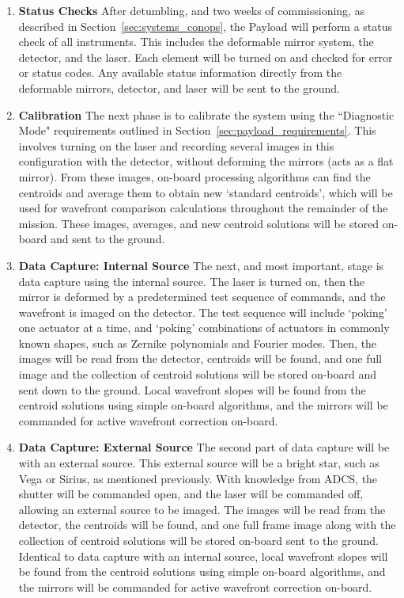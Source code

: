 \documentclass[12pt]{article}
\begin{document}
\begin{enumerate}
\item{\textbf{Status Checks}}
After detumbling, and two weeks of commissioning, as described in
Section~\ref{sec:systems_conops}, the Payload will perform a status check of all instruments. This includes the deformable mirror system, the detector, and the laser. Each element will be turned on and checked for error or status codes. Any available status information directly from the deformable mirrors, detector, and laser will be sent to the ground.

\item{\textbf{Calibration}}
The next phase is to calibrate the system using the ``Diagnostic Mode" requirements outlined in Section~\ref{sec:payload_requirements}.  This involves turning on the laser and recording several images in this configuration with the detector, without deforming the mirrors (acts as a flat mirror). From these images, on-board processing algorithms can find the centroids \cite{centroids} and average them to obtain new `standard centroids', which will be used for wavefront comparison calculations throughout the remainder of the mission. These images, averages, and new centroid solutions will be stored on-board and sent to the ground.

\item{\textbf{Data Capture: Internal Source}}
The next, and most important, stage is data capture using the internal source. The laser is turned on, then the mirror is deformed by a predetermined test sequence of commands, and the wavefront is imaged on the detector. The test sequence will include `poking' one actuator at a time, and `poking' combinations of actuators in commonly known shapes, such as Zernike polynomials and Fourier modes.  Then, the images will be read from the detector, centroids will be found, and one full image and the collection of centroid solutions will be stored on-board and sent down to the ground.  Local wavefront slopes will be found from the centroid solutions using simple on-board algorithms, and the mirrors will be commanded for active wavefront correction on-board.

\item{\textbf{Data Capture: External Source}}
The second part of data capture will be with an external source. This external source will be a bright star, such as Vega or Sirius, as mentioned previously.  With
knowledge from ADCS, the shutter will be commanded open, and the laser
will be commanded off, allowing an external source to be imaged. The
images will be read from the detector, the centroids will be found, and one
full frame image along with the collection of centroid solutions will be stored on-board 
sent to the ground.  Identical to data capture with an internal source, local wavefront slopes will be found from the centroid solutions using simple on-board algorithms, and the mirrors will be commanded for active wavefront correction on-board. 

\end{enumerate}
\end{document}
